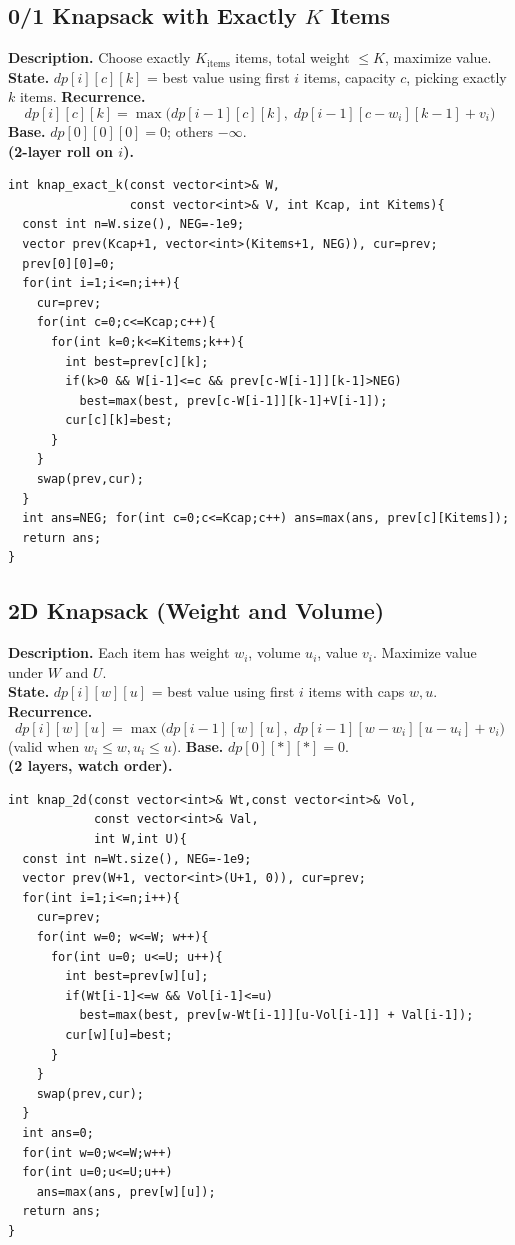 \documentclass[9pt]{extarticle}
\begin{document}
\subsection{0/1 Knapsack with Exactly \(K\) Items}
\textbf{Description.} Choose exactly \(K_{\text{items}}\) items, total weight \(\le K\), maximize value.  \\
\textbf{State.} \(dp[i][c][k]\) = best value using first \(i\) items, capacity \(c\), picking exactly \(k\) items.  
\textbf{Recurrence.}
\[
dp[i][c][k]=\max\Big(dp[i-1][c][k],\; dp[i-1][c-w_i][k-1]+v_i\Big)
\]
\textbf{Base.} \(dp[0][0][0]=0\); others \(-\infty\).  \\
\textbf{(2-layer roll on \(i\)).}
\begin{verbatim}
int knap_exact_k(const vector<int>& W, 
                 const vector<int>& V, int Kcap, int Kitems){
  const int n=W.size(), NEG=-1e9;
  vector prev(Kcap+1, vector<int>(Kitems+1, NEG)), cur=prev;
  prev[0][0]=0;
  for(int i=1;i<=n;i++){
    cur=prev;
    for(int c=0;c<=Kcap;c++){
      for(int k=0;k<=Kitems;k++){
        int best=prev[c][k];
        if(k>0 && W[i-1]<=c && prev[c-W[i-1]][k-1]>NEG)
          best=max(best, prev[c-W[i-1]][k-1]+V[i-1]);
        cur[c][k]=best;
      }
    }
    swap(prev,cur);
  }
  int ans=NEG; for(int c=0;c<=Kcap;c++) ans=max(ans, prev[c][Kitems]);
  return ans;
}
\end{verbatim}

\subsection{2D Knapsack (Weight and Volume)}
\textbf{Description.} Each item has weight \(w_i\), volume \(u_i\), value \(v_i\). Maximize value under \(W\) and \(U\).  \\
\textbf{State.} \(dp[i][w][u]\) = best value using first \(i\) items with caps \(w,u\).  \\
\textbf{Recurrence.}
\[
dp[i][w][u]=\max\Big(dp[i-1][w][u],\; dp[i-1][w-w_i][u-u_i]+v_i\Big)
\]
(valid when \(w_i\le w, u_i\le u\)).  
\textbf{Base.} \(dp[0][*][*]=0\).  \\
\textbf{(2 layers, watch order).}
\begin{verbatim}
int knap_2d(const vector<int>& Wt,const vector<int>& Vol,
            const vector<int>& Val,
            int W,int U){
  const int n=Wt.size(), NEG=-1e9;
  vector prev(W+1, vector<int>(U+1, 0)), cur=prev;
  for(int i=1;i<=n;i++){
    cur=prev;
    for(int w=0; w<=W; w++){
      for(int u=0; u<=U; u++){
        int best=prev[w][u];
        if(Wt[i-1]<=w && Vol[i-1]<=u)
          best=max(best, prev[w-Wt[i-1]][u-Vol[i-1]] + Val[i-1]);
        cur[w][u]=best;
      }
    }
    swap(prev,cur);
  }
  int ans=0; 
  for(int w=0;w<=W;w++) 
  for(int u=0;u<=U;u++) 
    ans=max(ans, prev[w][u]);
  return ans;
}
\end{verbatim}
\end{document}
